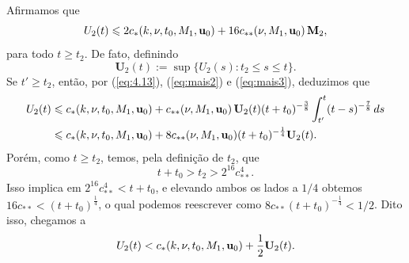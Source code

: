 \begin{prf}
\[    \]
    Afirmamos que
    \begin{equation} \label{eq:W5}
        U_2(t) \leqslant 2 c_* (k,\nu,t_0,M_1,\mathbf{u}_0) + 16 c_{**}(\nu,M_1,\mathbf{u}_0) \, \mathbf{M}_2,
    \end{equation}
    para todo $t\geqslant t_2$.
    De fato, definindo
    \[
        \mathbf{U}_2(t) := \sup\{ U_2(s): t_2 \leqslant s \leqslant t\}.
    \]
    Se $t' \geqslant t_2$, então, por (\ref{eq:4.13}), (\ref{eq:mais2}) e (\ref{eq:mais3}), deduzimos que
    \[
        \begin{aligned}
            U_2(t) &\leqslant c_* (k, \nu, t_0, M_1, \mathbf{u}_0) + c_{**} (\nu,M_1, \mathbf{u}_0) \, \mathbf{U}_2(t) (t + t_0)^{-\frac{3}{8}} \int_{t'}^t (t -s)^{-\frac{7}{8}} \,ds\\
            &\leqslant c_* (k, \nu, t_0, M_1, \mathbf{u}_0) + 8c_{**} (\nu,M_1, \mathbf{u}_0) (t + t_0)^{-\frac{1}{4}}\mathbf{U}_2(t). 
        \end{aligned}
    \]
    Porém, como $t \geqslant t_2$, temos, pela definição de $t_2$, que
    \[
        t + t_0 > t_2 > 2^{16} c_{**}^4.
    \]
    Isso implica em $2^{16} c_{**}^4 < t + t_0$, e elevando ambos os lados a $1/4$ obtemos $16 c_{**} < (t + t_0)^{\frac{1}{4}}$, o qual podemos reescrever como $8c_{**} (t + t_0)^{-\frac{1}{4}} < 1/2$. Dito isso, chegamos a
    \[
        U_2(t) < c_*(k,\nu,t_0,M_1, \mathbf{u}_0) + \frac{1}{2} \mathbf{U}_2(t).
    \]


\end{prf}
